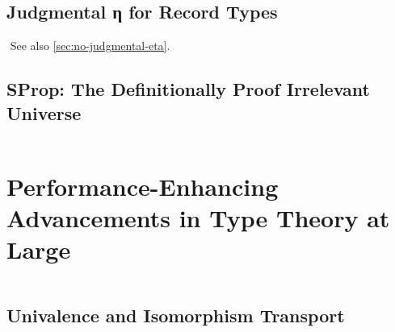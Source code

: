 \subsection{Judgmental η for Record Types}\label{sec:fixes:theory:record-eta}\label{sec:record-eta}
$\left.\right.$
See also \autoref{sec:no-judgmental-eta}.
\subsection{SProp: The Definitionally Proof Irrelevant Universe}\label{sec:fixes:theory:sprop}\label{sec:sprop}
$\left.\right.$

\section{Performance-Enhancing Advancements in Type Theory at Large}\label{sec:fixes:theory}
$\left.\right.$
\subsection{Univalence and Isomorphism Transport}\label{sec:fixes:theory:univalence}\label{sec:univalence}
$\left.\right.$
